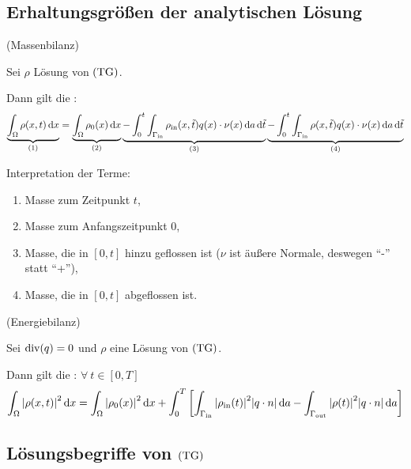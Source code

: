 \subsection{Erhaltungsgrößen der analytischen Lösung}
\begin{Lemma}(Massenbilanz)
	\label{Massenbilanz}
	
	Sei $ \rho $ Lösung von $ \operatorname{(TG)} $. 
	
	Dann gilt die :
	\[ \underbrace{\int_{\Omega} \rho(x,t) \mathop{}\!\mathrm{d} x}_{(1)} = \underbrace{\int_{\Omega} \rho_0(x) \mathop{}\!\mathrm{d} x}_{(2)}  \underbrace{-\int_{0}^{t} \int_{\Gamma_{\text{in}}} \rho_{\text{in}}(x,\tilde{t}) q(x) \cdot \nu(x) \mathop{}\!\mathrm{d} a \mathop{}\!\mathrm{d} \tilde{t}}_{(3)} \underbrace{- \int_{0}^{t} \int_{\Gamma_{\text{in}}} \rho(x,\tilde{t}) q(x) \cdot \nu(x) \mathop{}\!\mathrm{d} a \mathop{}\!\mathrm{d} \tilde{t}}_{(4)} \]
\end{Lemma}
	Interpretation der Terme:
	\begin{enumerate}[label=(\arabic*)]
		\item Masse zum Zeitpunkt $ t $,
		\item Masse zum Anfangszeitpunkt $ 0 $,
		\item Masse, die in $ [0,t] $ hinzu geflossen ist ($ \nu $ ist äußere Normale, deswegen \enquote{-} statt \enquote{+}),
		\item Masse, die in $ [0,t] $ abgeflossen ist.
	\end{enumerate}

\begin{Lemma}(Energiebilanz)
	\label{Energiegleichung}
	
	Sei $ \operatorname{div}(q) = 0 $ und $ \rho $ eine Lösung von $ \operatorname{(TG)} $. 
	
	Dann gilt die : $ \forall \ t\in [0,T] $
	\[\int_{\Omega} \abs{\rho(x,t)}^2 \mathop{}\!\mathrm{d} x = \int_{\Omega} \abs{\rho_0(x)}^2 \mathop{}\!\mathrm{d} x  + \int_{0}^{T} \left[ \int_{\Gamma_{\text{in}}}\abs{\rho_{\text{in}}(t)}^2 \abs{q\cdot n} \mathop{}\!\mathrm{d} a - \int_{\Gamma_{\text{out}}} \abs{\rho(t)}^2 \abs{q\cdot n} \mathop{}\!\mathrm{d} a  \right] \]
\end{Lemma}

\subsection{Lösungsbegriffe von $ \operatorname{(TG)} $}


